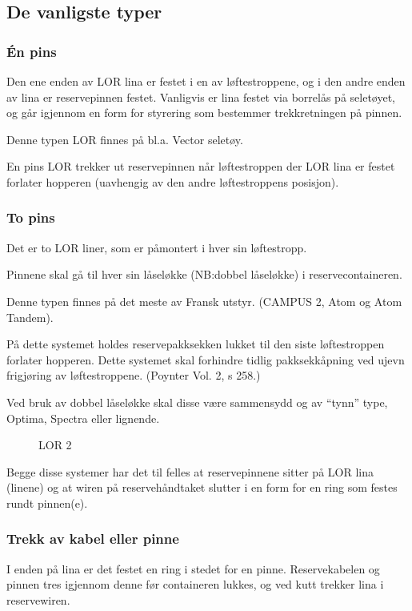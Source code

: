 \subsection{De vanligste typer}
\subsubsection{Én pins}
Den ene enden av LOR lina er festet i en av løftestroppene, og i den andre enden av lina er reservepinnen festet. Vanligvis er lina festet via borrelås på seletøyet, og går igjennom en form for styrering som bestemmer trekkretningen på pinnen.

Denne typen LOR finnes på bl.a. Vector seletøy.

En pins LOR trekker ut reservepinnen når løftestroppen der LOR lina er festet forlater hopperen (uavhengig av den andre løftestroppens posisjon).

\subsubsection{To pins}
Det er to LOR liner, som er påmontert i hver sin løftestropp.

Pinnene skal gå til hver sin låseløkke (NB:dobbel låseløkke) i reservecontaineren.

Denne typen finnes på det meste av Fransk utstyr. (CAMPUS 2, Atom og Atom Tandem).

På dette systemet holdes reservepakksekken lukket til den siste løftestroppen forlater hopperen. Dette systemet skal forhindre tidlig pakksekkåpning ved ujevn frigjøring av løftestroppene. (Poynter Vol. 2, s 258.)

Ved bruk av dobbel låseløkke skal disse være sammensydd og av ``tynn'' type, Optima, Spectra eller lignende.

\begin{figure}
	\caption{LOR 2}
\end{figure}

Begge disse systemer har det til felles at reservepinnene sitter på LOR lina (linene) og at wiren på reservehåndtaket slutter i en form for en ring som festes rundt pinnen(e).

\subsubsection{Trekk av kabel eller pinne}
I enden på lina er det festet en ring i stedet for en pinne. Reservekabelen og pinnen tres igjennom denne før containeren lukkes, og ved kutt trekker lina i reservewiren.

